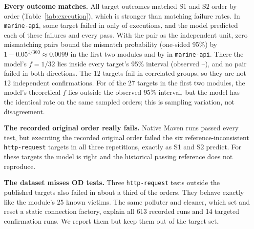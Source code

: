 \documentclass[conference,letterpaper]{IEEEtran}
\theoremstyle{definition}
\begin{document}
\begin{table}[t]
\caption{Real executions: complete-suite size / OD targets, independent pairs, ranges of observed anchor $f$ and joint $B$ across targets, and S1 mismatches / target outcomes. These ranges are not confidence intervals.}\label{tab:execution}
\centering\small
\setlength{\tabcolsep}{2.5pt}
\end{table}

\textbf{Every outcome matches.} All \ExecAllComparisons{} target outcomes matched S1 and S2 order by order (Table~\ref{tab:execution}), which is stronger than matching failure rates. In \texttt{marine-api}, some target failed in only \ExecRareFailingDirections{} of \ExecRareDirections{} executions, and the model predicted each of these failures and every pass. With the pair as the independent unit, zero mismatching pairs bound the mismatch probability (one-sided 95\%) by $1-0.05^{1/300}\approx0.0099$ in the first two modules and by \ExecRareZeroBound{} in \texttt{marine-api}. There the model's $f=1/32$ lies inside every target's 95\% interval (observed \ExecRareFMin--\ExecRareFMax), and no pair failed in both directions. The 12 targets fail in correlated groups, so they are not 12 independent confirmations. For \ExecMarginalOutside{} of the 27 targets in the first two modules, the model's theoretical $f$ lies outside the observed 95\% interval, but the model has the identical rate on the same sampled orders; this is sampling variation, not disagreement.

\textbf{The recorded original order really fails.} Native Maven runs passed every test, but executing the recorded original order failed the six reference-inconsistent \texttt{http-request} targets in all three repetitions, exactly as S1 and S2 predict. For these targets the model is right and the historical passing reference does not reproduce.

\textbf{The dataset misses OD tests.} Three \texttt{http-request} tests outside the published targets also failed in about a third of the orders. They behave exactly like the module's 25 known victims. The same polluter and cleaner, which set and reset a static connection factory, explain all 613 recorded runs and 14 targeted confirmation runs. We report them but keep them out of the target set.
\end{document}
